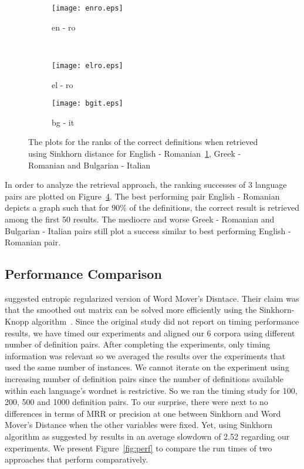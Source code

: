 \begin{figure}[!htbp]
    \centering
    \begin{subfigure}[b]{0.45\linewidth}
        \texttt{[image: enro.eps]}
        \caption{en - ro}%
        \label{subfig:enro}
    \end{subfigure}
    ~
    \begin{subfigure}[b]{0.45\linewidth}
        \texttt{[image: elro.eps]}
        \caption{el - ro}%
        \label{subfig:elro}
    \end{subfigure}

    \begin{subfigure}[b]{0.45\linewidth}
        \texttt{[image: bgit.eps]}
        \caption{bg - it}%
        \label{subfig:bgit}
    \end{subfigure}
    \caption{The plots for the ranks of the correct definitions when retrieved using Sinkhorn distance for English - Romanian~\ref{subfig:enro}, Greek - Romanian and Bulgarian - Italian}%
    \label{fig:success_plots}
\end{figure}

In order to analyze the retrieval approach, the ranking successes of 3 language pairs are plotted on Figure~\ref{fig:success_plots}.
The best performing pair English - Romanian depicts a graph such that for 90\% of the definitions, the correct result is retrieved among the first 50 results.
The mediocre and worse Greek - Romanian and Bulgarian - Italian pairs still plot a success similar to best performing English - Romanian pair.


\subsection{Performance Comparison}%
\label{sub:performance_comparison}

\textcite{balikasCrosslingual2018} suggested entropic regularized version of Word Mover's Disntace.
Their claim was that the smoothed out matrix can be solved more efficiently using the Sinkhorn-Knopp algorithm~\cite{sinkhornConcerning1967}.
Since the original study did not report on timing performance results, we have timed our experiments and aligned our 6 corpora using different number of definition pairs.
After completing the experiments, only timing information was relevant so we averaged the results over the experiments that used the same number of instances.
We cannot iterate on the experiment using increasing number of definition pairs since the number of definitions available within each language's wordnet is restrictive.
So we ran the timing study for 100, 200, 500 and 1000 definition pairs.
To our surprise, there were next to no differences in terms of MRR or precision at one between Sinkhorn and Word Mover's Distance when the other variables were fixed.
Yet, using Sinkhorn algorithm as suggested by \citeauthor{balikasCrosslingual2018} results in an average slowdown of 2.52 regarding our experiments.
We present Figure~\ref{fig:perf} to compare the run times of two approaches that perform comparatively.

